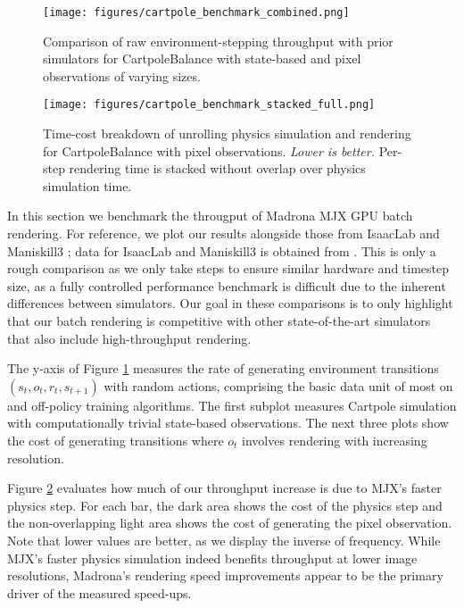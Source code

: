 \begin{figure}[t]
    \centering
    \texttt{[image: figures/cartpole\_benchmark\_combined.png]}
    \caption{\small Comparison of raw environment-stepping throughput with prior simulators for CartpoleBalance with state-based and pixel observations of varying sizes.}
    \label{fig:cartpole_benchmark_combined}
\end{figure}

\begin{figure}[t]
    \centering
    \texttt{[image: figures/cartpole\_benchmark\_stacked\_full.png]}
    \caption{\small Time-cost breakdown of unrolling physics simulation and rendering for CartpoleBalance with pixel observations. \emph{Lower is better.} Per-step  rendering time is stacked without overlap over physics simulation time.}
    \label{fig:cartpole_benchmark_stacked}
\end{figure}

In this section we benchmark the througput of Madrona MJX GPU batch rendering. For reference, we plot our results alongside those from IsaacLab \cite{mittal2023orbit} and Maniskill3 \cite{tao2024maniskill3}; data for IsaacLab and Maniskill3 is obtained from \cite{tao2024maniskill3}. This is only a rough comparison as we only take steps to ensure similar hardware and timestep size, as a fully controlled performance benchmark is difficult due to the inherent differences between simulators. Our goal in these comparisons is to only highlight that our batch rendering is competitive with other state-of-the-art simulators that also include high-throughput rendering. %

The y-axis of Figure \ref{fig:cartpole_benchmark_combined} measures the rate of generating environment transitions $(s_t, o_t, r_t, s_{t+1})$ with random actions, comprising the basic data unit of most on and off-policy training algorithms. The first subplot measures Cartpole simulation with computationally trivial state-based observations. The next three plots show the cost of generating transitions where $o_t$ involves rendering with increasing resolution.

Figure \ref{fig:cartpole_benchmark_stacked} evaluates how much of our throughput increase is due to MJX's faster physics step. For each bar, the dark area shows the cost of the physics step and the non-overlapping light area shows the cost of generating the pixel observation. Note that lower values are better, as we display the inverse of frequency. While MJX's faster physics simulation indeed benefits throughput at lower image resolutions, Madrona's rendering speed improvements appear to be the primary driver of the measured speed-ups.

